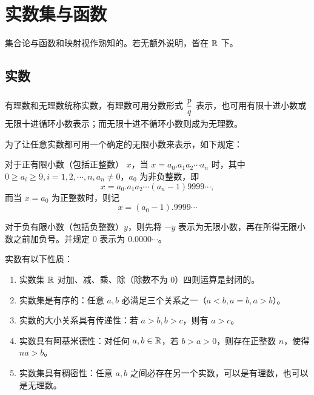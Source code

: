 \chapter{实数集与函数}

集合论与函数和映射视作熟知的。若无额外说明，皆在 $\mathbb{R}$ 下。

\section{实数}

有理数和无理数统称实数，有理数可用分数形式 $\mfrac{p}{q}$ 表示，也可用有限十进小数或无限十进循环小数表示；而无限十进不循环小数则成为无理数。

为了让任意实数都可用一个确定的无限小数来表示，如下规定：

对于正有限小数（包括正整数） $x$，当 $x=a_0.a_1a_2\cdots{}a_n$ 时，其中 $0\ge a_i \ge 9,i=1,2,\cdots,n,a_n\neq 0$，$a_0$ 为非负整数，即 $$x=a_0.a_1a_2\cdots{}(a_n-1)9999\cdots,$$ 而当 $x=a_0$ 为正整数时，则记 $$x=(a_0-1).9999\cdots$$

对于负有限小数（包括负整数）$y$，则先将 $-y$ 表示为无限小数，再在所得无限小数之前加负号。并规定 $0$ 表示为 $0.0000\cdots$。



实数有以下性质：

\begin{enumerate}
	\item 实数集 $\mathbb{R}$ 对加、减、乘、除（除数不为 $0$）四则运算是封闭的。
	\item 实数集是有序的：任意 $a,b$ 必满足三个关系之一（$a<b,a=b,a>b$）。
	\item 实数的大小关系具有传递性：若 $a>b,b>c$，则有 $a>c$。
	\item 实数具有阿基米德性：对任何 $a,b\in\mathbb{R}$，若 $b>a>0$，则存在正整数 $n$，使得 $na>b$。
	\item 实数集具有稠密性：任意 $a,b$ 之间必存在另一个实数，可以是有理数，也可以是无理数。
\end{enumerate}

